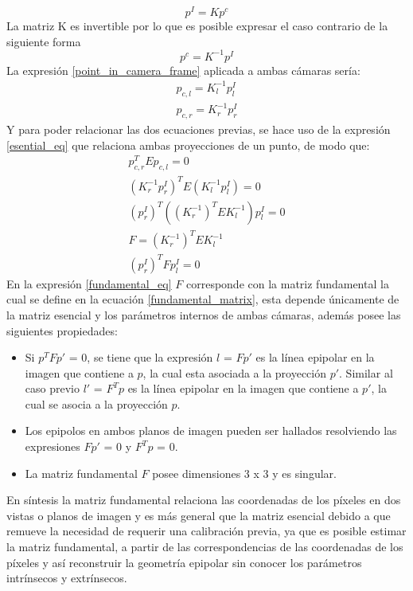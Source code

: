 \begin{equation}
    p^{I} = Kp^{c}
\end{equation}
La matriz K es invertible por lo que es posible expresar el caso contrario de la siguiente forma
\begin{equation}
    p^{c} = K^{-1}p^{I} \label{point_in_camera_frame}
\end{equation}
La expresión \ref{point_in_camera_frame} aplicada a ambas cámaras sería:
\begin{align}
    p_{c,l} = K^{-1}_{l}p^{I}_{l}\\
    p_{c,r} = K^{-1}_{r}p^{I}_{r}
\end{align}
Y para poder relacionar las dos ecuaciones previas, se hace uso de la expresión \ref{esential_eq} que relaciona ambas proyecciones de un punto, de modo que:
\begin{align}
    p_{c,r}^{T} E p_{c,l} = 0\\
    (K^{-1}_{r}p^{I}_{r})^{T}E(K^{-1}_{l}p^{I}_{l}) = 0\\
    (p^{I}_{r})^{T}((K^{-1}_{r})^{T}EK^{-1}_{l})p^{I}_{l} = 0\\
    F = (K^{-1}_{r})^{T}EK^{-1}_{l} \label{fundamental_matrix} \\
    (p^{I}_{r})^{T}Fp^{I}_{l} = 0 \label{fundamental_eq}
\end{align}
En la expresión \ref{fundamental_eq} $F$ corresponde con la matriz fundamental la cual se define en la ecuación \ref{fundamental_matrix}, esta depende únicamente de la matriz esencial y los parámetros internos de ambas cámaras, además posee las siguientes propiedades:
\begin{itemize}
    \item Si $p^{T}Fp'$ = 0, se tiene que la expresión $l$ = $Fp'$ es la línea epipolar en la imagen que contiene a $p$, la cual esta asociada a la proyección $p'$. Similar al caso previo $l'$ = $F^{T}p$ es la línea epipolar en la imagen que contiene a $p'$, la cual se asocia a la proyección $p$.
    \item Los epipolos en ambos planos de imagen pueden ser hallados resolviendo las expresiones $Fp'$ = 0 y $F^{T}p$ = 0.
    \item La matriz fundamental $F$ posee dimensiones 3 x 3 y es singular.
\end{itemize}
En síntesis la matriz fundamental relaciona las coordenadas de los píxeles en dos vistas o planos de imagen y es más general que la matriz esencial debido a que remueve la necesidad de requerir una calibración previa, ya que es posible estimar la matriz fundamental, a partir de las correspondencias de las coordenadas de los píxeles y así reconstruir la geometría epipolar sin conocer los parámetros intrínsecos y extrínsecos.

